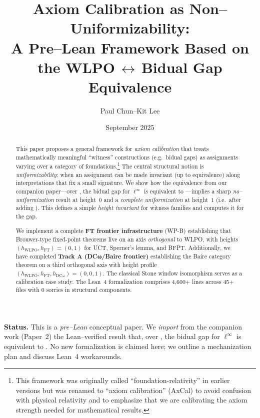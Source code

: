 \documentclass[11pt]{article}
\title{Axiom Calibration as Non--Uniformizability:\\
A Pre--Lean Framework Based on the WLPO\,$\boldsymbol{\leftrightarrow}$\,Bidual Gap Equivalence}
\author{Paul Chun--Kit Lee}
\date{September 2025}
\theoremstyle{definition}
\theoremstyle{remark}
\newcommand{\linf}{\ell^\infty}
\newcommand{\WLPO}{\mathrm{WLPO}}
\newcommand{\BISH}{\mathrm{BISH}}
\begin{document}
\maketitle

\begin{abstract}
This paper proposes a general framework for \emph{axiom calibration} that treats mathematically meaningful ``witness'' constructions (e.g.\ bidual gaps) as assignments varying over a category of foundations.\footnote{This framework was originally called ``foundation-relativity'' in earlier versions but was renamed to ``axiom calibration'' (AxCal) to avoid confusion with physical relativity and to emphasize that we are calibrating the axiom strength needed for mathematical results.} The central structural notion is \emph{uniformizability}: when an assignment can be made invariant (up to equivalence) along interpretations that fix a small signature. We show how the equivalence from our companion paper---over \BISH, the bidual gap for $\linf$ is equivalent to \WLPO---implies a sharp \emph{no--uniformization} result at height~$0$ and a \emph{complete uniformization} at height~$1$ (i.e.\ after adding \WLPO). This defines a simple \emph{height invariant} for witness families and computes it for the gap.

We implement a complete \textbf{FT frontier infrastructure} (WP-B) establishing that Brouwer-type fixed-point theorems live on an axis \emph{orthogonal} to WLPO, with heights $(h_{\text{WLPO}}, h_{\text{FT}}) = (0, 1)$ for UCT, Sperner's lemma, and BFPT. Additionally, we have completed \textbf{Track A (DCω/Baire frontier)} establishing the Baire category theorem on a third orthogonal axis with height profile $(h_{\text{WLPO}}, h_{\text{FT}}, h_{\text{DCω}}) = (0, 0, 1)$. The classical Stone window isomorphism serves as a calibration case study. The Lean~4 formalization comprises 4,600+ lines across 45+ files with 0 sorries in structural components.
\end{abstract}

\begin{mdframed}[style=status]
\textbf{Status.} This is a \emph{pre--Lean} conceptual paper. We \emph{import} from the companion work (Paper~2) the Lean--verified result that, over \BISH, the bidual gap for $\linf$ is equivalent to \WLPO. No new formalization is claimed here; we outline a mechanization plan and discuss Lean~4 workarounds.
\end{mdframed}

\tableofcontents
\end{document}
